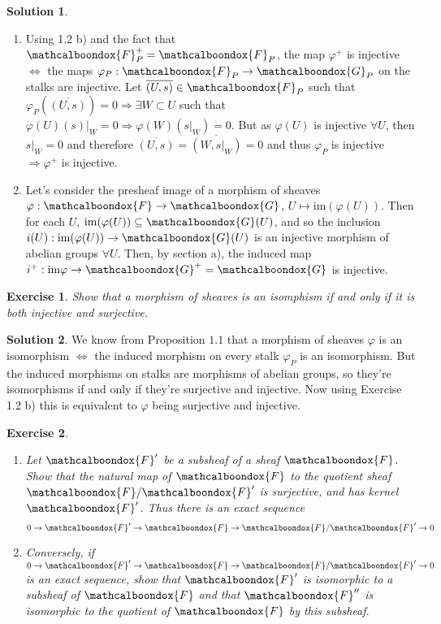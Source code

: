 \documentclass[12pt]{article}
\newcommand{\imp}{\ensuremath{\Rightarrow}}
\newcommand{\ima}{\ensuremath{\mathrm{im}}}
\newtheorem{ex}{Exercise}[section]
\theoremstyle{definition}
\newtheorem*{sol}{Solution}
\newcommand{\sF}{\ensuremath{\mathcalboondox{F}}}
\newcommand{\sG}{\ensuremath{\mathcalboondox{G}}}
\begin{document}
\begin{sol}
	\begin{enumerate}[label=\alph*)]
		\item Using 1.2 b) and the fact that $\sF^{+}_P = \sF_P$, the map $\varphi^{+}$ is injective $\iff$ the maps $\varphi_P: \sF_P \to \sG_P$ on the stalks are injective. Let $\overline{(U,s)} \in \sF_P$ such that $\varphi_P(\overline{(U,s)}) = 0 \imp \exists W \subset U$ such that $\varphi(U)(s)|_W = 0 \imp \varphi(W)(s|_W) = 0$. But as $\varphi(U)$ is injective $\forall U$, then $s|_W = 0$ and therefore $\overline{(U,s)} = \overline{(W,s|_W)} = 0$ and thus $\varphi_P$ is injective $\imp \varphi^{+}$ is injective.

		\item Let's consider the presheaf image of a morphism of sheaves $\varphi: \sF \to \sG$, $U \mapsto \ima (\varphi(U))$. Then for each $U$, $\ima (\varphi(U)) \subseteq \sG(U)$, and so the inclusion $i(U): \ima (\varphi(U)) \to \sG(U)$ is an injective morphism of abelian groups $\forall U$. Then, by section a), the induced map $i^{+}: \ima \varphi \to \sG^{+} = \sG$ is injective. 
	\end{enumerate}
\end{sol}

\begin{ex}
	Show that a morphism of sheaves is an isomphism if and only if it is both injective and surjective.
\end{ex}

\begin{sol}
	We know from Proposition $1.1$ that a morphism of sheaves $\varphi$ is an isomorphism $\iff$ the induced morphism on every stalk $\varphi_P$ is an isomorphism. But the induced morphisms on stalks are morphisms of abelian groups, so they're isomorphisms if and only if they're surjective and injective. Now using Exercise 1.2 b) this is equivalent to $\varphi$ being surjective and injective.
\end{sol}

\begin{ex}
	\begin{enumerate}[label=\alph*)]
		\item Let $\sF'$ be a subsheaf of a sheaf $\sF$. Show that the natural map of $\sF$ to the quotient sheaf $\sF / \sF'$ is surjective, and has kernel $\sF'$. Thus there is an exact sequence
		\[
			0 \to \sF' \to \sF \to \sF / \sF' \to 0
		\]

		\item Conversely, if $0 \to \sF' \to \sF \to \sF / \sF' \to 0$ is an exact sequence, show that $\sF'$ is isomorphic to a subsheaf of $\sF$ and that $\sF''$ is isomorphic to the quotient of $\sF$ by this subsheaf.
	\end{enumerate}
\end{ex}
\end{document}
